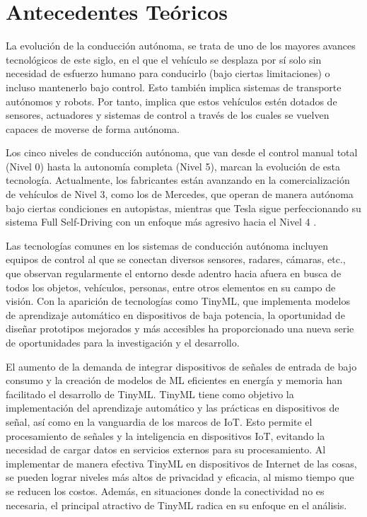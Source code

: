 \section{Antecedentes Teóricos}
La evolución de la conducción autónoma, se trata de uno de los mayores avances tecnológicos de este siglo, en el que el vehículo se desplaza por sí solo sin necesidad de esfuerzo humano para conducirlo (bajo ciertas limitaciones) o incluso mantenerlo bajo control. Esto también implica sistemas de transporte autónomos y robots. Por tanto, implica que estos vehículos estén dotados de sensores, actuadores y sistemas de control a través de los cuales se vuelven capaces de moverse de forma autónoma.

Los cinco niveles de conducción autónoma, que van desde el control manual total (Nivel 0) hasta la autonomía completa (Nivel 5), marcan la evolución de esta tecnología. Actualmente, los fabricantes están avanzando en la comercialización de vehículos de Nivel 3, como los de Mercedes, que operan de manera autónoma bajo ciertas condiciones en autopistas, mientras que Tesla sigue perfeccionando su sistema Full Self-Driving con un enfoque más agresivo hacia el Nivel 4 \cite{mlearning2021}.

Las tecnologías comunes en los sistemas de conducción autónoma incluyen equipos de control al que se conectan diversos sensores, radares, cámaras, etc., que observan regularmente el entorno desde adentro hacia afuera en busca de todos los objetos, vehículos, personas, entre otros elementos en su campo de visión. Con la aparición de tecnologías como TinyML, que implementa modelos de aprendizaje automático en dispositivos de baja potencia, la oportunidad de diseñar prototipos mejorados y más accesibles ha proporcionado una nueva serie de oportunidades para la investigación y el desarrollo.

El aumento de la demanda de integrar dispositivos de señales de entrada de bajo consumo y la creación de modelos de ML eficientes en energía y memoria han facilitado el desarrollo de TinyML. TinyML tiene como objetivo la implementación del aprendizaje automático y las prácticas en dispositivos de señal, así como en la vanguardia de los marcos de IoT. Esto permite el procesamiento de señales y la inteligencia en dispositivos IoT, evitando la necesidad de cargar datos en servicios externos para su procesamiento. Al implementar de manera efectiva TinyML en dispositivos de Internet de las cosas, se pueden lograr niveles más altos de privacidad y eficacia, al mismo tiempo que se reducen los costos. Además, en situaciones donde la conectividad no es necesaria, el principal atractivo de TinyML radica en su enfoque en el análisis.


